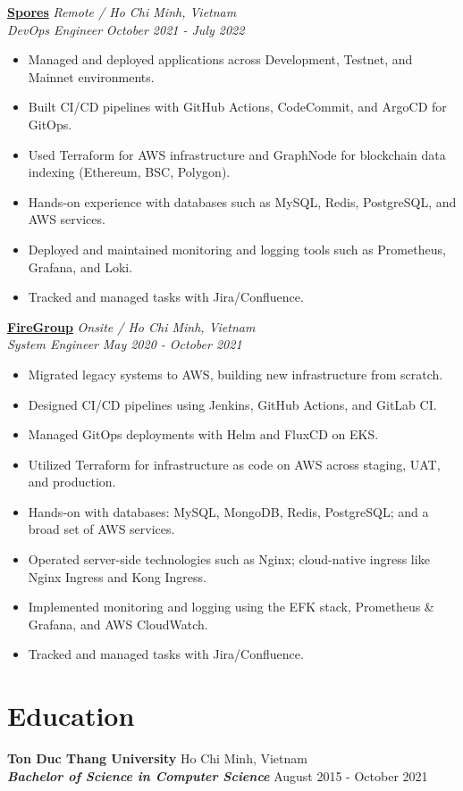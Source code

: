 \documentclass[11pt, a4paper]{article}
\begin{document}
\vspace{0.5em}
{\large\textbf{\href{https://spores.app/}{Spores}}} \hfill {\small\textit{Remote / Ho Chi Minh, Vietnam}} \\
\textit{DevOps Engineer} \hfill {\small\textit{October 2021 - July 2022}}
\begin{itemize}[leftmargin=*]
    \item Managed and deployed applications across Development, Testnet, and Mainnet environments.
    \item Built CI/CD pipelines with GitHub Actions, CodeCommit, and ArgoCD for GitOps.
    \item Used Terraform for AWS infrastructure and Graph\-Node for block\-chain data in\-dex\-ing (Ethereum, BSC, Polygon).
    \item Hands-on experience with databases such as MySQL, Redis, PostgreSQL, and AWS services.
    \item Deployed and maintained monitoring and logging tools such as Prometheus, Grafana, and Loki.
    \item Tracked and managed tasks with Jira/Confluence.
\end{itemize}

\vspace{0.5em}
{\large\textbf{\href{https://firegroup.io/}{FireGroup}}} \hfill {\small\textit{Onsite / Ho Chi Minh, Vietnam}} \\
\textit{System Engineer} \hfill {\small\textit{May 2020 - October 2021}}
\begin{itemize}[leftmargin=*]
    \item Migrated legacy systems to AWS, building new infrastructure from scratch.
    \item Designed CI/CD pipelines using Jenkins, GitHub Actions, and GitLab CI.
    \item Managed GitOps deployments with Helm and FluxCD on EKS.
    \item Utilized Terraform for infrastructure as code on AWS across staging, UAT, and production.
    \item Hands-on with databases: MySQL, MongoDB, Redis, PostgreSQL; and a broad set of AWS services.
    \item Operated server-side technologies such as Nginx; cloud-native ingress like Nginx Ingress and Kong Ingress.
    \item Implemented monitoring and logging using the EFK stack, Prometheus \& Grafana, and AWS CloudWatch.
    \item Tracked and managed tasks with Jira/Confluence.
\end{itemize}


\section{Education}
\textbf{Ton Duc Thang University} \hfill Ho Chi Minh, Vietnam \\
\textit{\textbf{Bachelor of Science in Computer Science}} \hfill August 2015 - October 2021 \\
\end{document}
